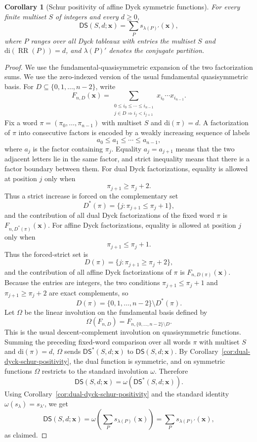 \documentclass[11pt]{article}
\theoremstyle{plain}
\newtheorem{corollary}[theorem]{Corollary}
\theoremstyle{definition}
\theoremstyle{remark}
\newcommand{\di}{\mathrm{di}}
\newcommand{\DS}{\mathsf{DS}}
\newcommand{\DSstar}{\mathsf{DS}^{*}}
\begin{document}
\begin{corollary}[Schur positivity of affine Dyck symmetric functions]
\label{cor:affine-dyck-schur-positivity}
For every finite multiset \(S\) of integers and every \(d\ge 0\),
\[
  \DS(S,d;\mathbf{x})
  =
  \sum_P s_{\lambda(P)'}(\mathbf{x}),
\]
where \(P\) ranges over all Dyck tableaux with entries the multiset \(S\) and
\(\di(\operatorname{RR}(P))=d\), and \(\lambda(P)'\) denotes the conjugate
partition.
\end{corollary}
\begin{proof}
We use the fundamental-quasisymmetric expansion of the two factorization
sums.  We use the zero-indexed version of the usual fundamental
quasisymmetric basis.  For \(D\subseteq\{0,1,\ldots,n-2\}\), write
\[
  F_{n,D}(\mathbf{x})
  =
  \sum_{\substack{0\le i_0\le \cdots\le i_{n-1}\\
                  j\in D\Rightarrow i_j<i_{j+1}}}
  x_{i_0}\cdots x_{i_{n-1}}.
\]
Fix a word \(\pi=(\pi_0,\ldots,\pi_{n-1})\) with multiset \(S\) and
\(\di(\pi)=d\).  A factorization of \(\pi\) into consecutive factors is encoded
by a weakly increasing sequence of labels
\[
  a_0\le a_1\le \cdots\le a_{n-1},
\]
where \(a_j\) is the factor containing \(\pi_j\).  Equality
\(a_j=a_{j+1}\) means that the two adjacent letters lie in the same factor, and
strict inequality means that there is a factor boundary between them.
For dual Dyck factorizations, equality is allowed at position \(j\) only when
\[
  \pi_{j+1}\ge \pi_j+2.
\]
Thus a strict increase is forced on the complementary set
\[
  D^*(\pi)=\{j:\pi_{j+1}\le \pi_j+1\},
\]
and the contribution of all dual Dyck factorizations of the fixed word \(\pi\)
is \(F_{n,D^*(\pi)}(\mathbf{x})\).
For affine Dyck factorizations, equality is allowed at position \(j\) only when
\[
  \pi_{j+1}\le \pi_j+1.
\]
Thus the forced-strict set is
\[
  D(\pi)=\{j:\pi_{j+1}\ge \pi_j+2\},
\]
and the contribution of all affine Dyck factorizations of \(\pi\) is
\(F_{n,D(\pi)}(\mathbf{x})\).  Because the entries are integers, the two
conditions \(\pi_{j+1}\le \pi_j+1\) and \(\pi_{j+1}\ge \pi_j+2\) are exact
complements, so
\[
  D(\pi)=\{0,1,\ldots,n-2\}\setminus D^*(\pi).
\]
Let \(\Omega\) be the linear involution on the fundamental basis defined by
\[
  \Omega(F_{n,D})
  =
  F_{n,\{0,\ldots,n-2\}\setminus D}.
\]
This is the usual descent-complement involution on quasisymmetric functions.
Summing the preceding fixed-word comparison over all words \(\pi\) with
multiset \(S\) and \(\di(\pi)=d\), \(\Omega\) sends
\(\DSstar(S,d;\mathbf{x})\) to \(\DS(S,d;\mathbf{x})\).  By
Corollary~\ref{cor:dual-dyck-schur-positivity}, the dual function is symmetric,
and on symmetric functions \(\Omega\) restricts to the standard involution
\(\omega\).  Therefore
\[
  \DS(S,d;\mathbf{x})
  =
  \omega(\DSstar(S,d;\mathbf{x})).
\]
Using Corollary~\ref{cor:dual-dyck-schur-positivity} and the standard identity
\(\omega(s_\lambda)=s_{\lambda'}\), we get
\[
  \DS(S,d;\mathbf{x})
  =
  \omega\left(\sum_P s_{\lambda(P)}(\mathbf{x})\right)
  =
  \sum_P s_{\lambda(P)'}(\mathbf{x}),
\]
as claimed.
\end{proof}
\end{document}
